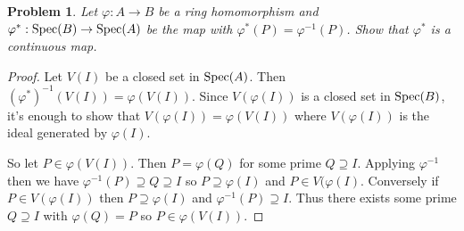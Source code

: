 \documentclass{article}
\newcommand{\spec}{\textup{Spec}}
\newtheorem{problem}{Problem}
\begin{document}
\begin{problem}
Let $\varphi : A \to B$ be a ring homomorphism and $\varphi^* : \spec(B) \to \spec(A)$ be the map with $\varphi^*(P) = \varphi^{-1}(P)$. Show that $\varphi^*$ is a continuous map.
\end{problem}
\begin{proof}
Let $V(I)$ be a closed set in $\spec(A)$. Then $(\varphi^*)^{-1}(V(I)) = \varphi(V(I))$. Since $V(\varphi(I))$ is a closed set in $\spec(B)$, it's enough to show that $V(\varphi(I)) = \varphi(V(I))$ where $V(\varphi(I))$ is the ideal generated by $\varphi(I)$.

So let $P \in \varphi(V(I))$. Then $P = \varphi(Q)$ for some prime $Q \supseteq I$. Applying $\varphi^{-1}$ then we have $\varphi^{-1}(P) \supseteq Q \supseteq I$ so $P \supseteq \varphi(I)$ and $P \in V(\varphi(I)$. Conversely if $P \in V(\varphi(I))$ then $P \supseteq \varphi(I)$ and $\varphi^{-1}(P) \supseteq I$. Thus there exists some prime $Q \supseteq I$ with $\varphi(Q) = P$ so $P \in \varphi(V(I))$.
\end{proof}
\end{document}
